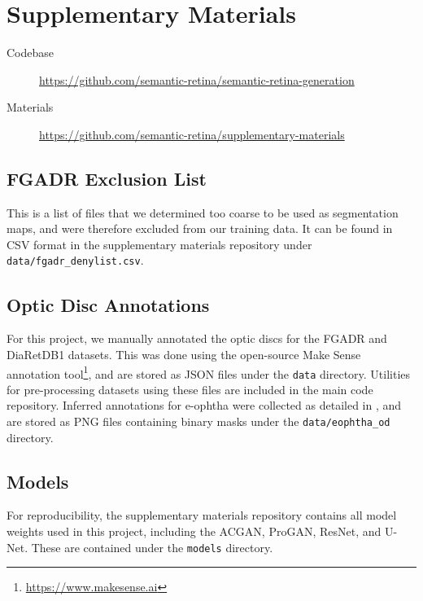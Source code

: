 \appendix

\chapter{Supplementary Materials} \label{cha:supp}

\begin{description}
\item[Codebase] \url{https://github.com/semantic-retina/semantic-retina-generation}
\item[Materials] \url{https://github.com/semantic-retina/supplementary-materials}
\end{description}

\section{FGADR Exclusion List} \label{sec:fgadr_excl}

This is a list of files that we determined too coarse to be used as segmentation maps, and were therefore excluded from our training data.
It can be found in CSV format in the supplementary materials repository under \lstinline{data/fgadr_denylist.csv}.

\section{Optic Disc Annotations} \label{sec:od}

For this project, we manually annotated the optic discs for the FGADR and DiaRetDB1 datasets.
This was done using the open-source Make Sense annotation tool\footnote{\url{https://www.makesense.ai}}, and are stored as JSON files under the \lstinline{data} directory.
Utilities for pre-processing datasets using these files are included in the main code repository.
Inferred annotations for e-ophtha were collected as detailed in , and are stored as PNG files containing binary masks under the \lstinline{data/eophtha_od} directory.

\section{Models} \label{sec:models}

For reproducibility, the supplementary materials repository contains all model weights used in this project, including the ACGAN, ProGAN, ResNet, and U-Net.
These are contained under the \lstinline{models} directory.

